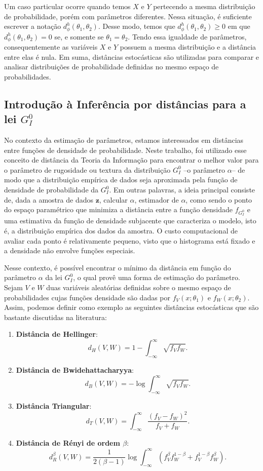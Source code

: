 Um caso particular ocorre quando temos $X$ e $Y$ pertecendo a mesma distribuição de probabilidade, porém com parâmetros diferentes. Nessa situação, é suficiente escrever a notação $d_\phi^h(\theta_1, \theta_2)$. Desse modo, temos que $d_\phi^h(\theta_1, \theta_2) \geq 0$ em que $d_\phi^h(\theta_1, \theta_2) = 0$ se, e somente se $\theta_1 = \theta_2$. Tendo essa igualdade de parâmetros, consequentemente as variáveis $X$ e $Y$ possuem a mesma distribuição e a distância entre elas é nula. Em suma, distâncias estocásticas são utilizadas para comparar e analisar distribuições de probabilidade definidas no mesmo espaço de probabilidades.

\subsection{Introdução à Inferência por distâncias para a lei $G_I^0$}

No contexto da estimação de parâmetros, estamos interessados em distâncias entre funções de densidade de probabilidade. 
Neste trabalho, foi utilizado esse conceito de distância da Teoria da Informação para encontrar o melhor valor para o parâmetro de rugosidade ou textura da distribuição $G_I^0$ --o parâmetro $\alpha$-- de modo que a distribuição empírica de dados seja aproximada pela função de densidade de probabilidade da $G_I^0$. 
Em outras palavras, a ideia principal consiste de, dada a amostra de dados $\bm z$, calcular $\widehat{\alpha}$, estimador de $\alpha$, como sendo o ponto do espaço paramétrico que minimiza a distância entre a função densidade $f_{G_I^0}$ e uma estimativa da função de densidade subjacente que caracteriza o modelo, isto é, a distribuição empírica dos dados da amostra. 
O custo computacional de avaliar cada ponto é relativamente pequeno, visto que o histograma está fixado e a densidade não envolve funções especiais. 

Nesse contexto, é possível encontrar o mínimo da distância em função do parâmetro $\alpha$ da lei $G_I^0$, o qual provê uma forma de estimação do parâmetro. 
Sejam $V$ e $W$ duas variáveis aleatórias definidas sobre o mesmo espaço de probabilidades cujas funções densidade são dadas por $f_V(x; \theta_1)$ e $f_W(x; \theta_2)$. 
Assim, podemos definir como exemplo as seguintes distâncias estocásticas que são bastante discutidas na literatura:
\begin{enumerate}
    \item \textbf{Distância de Hellinger}: $$ d_H(V,W) = 1 - \int_{-\infty}^{\infty}\sqrt{f_V f_W}.$$
    \item \textbf{Distância de Bwidehattacharyya}: $$d_B(V,W) = -\log\int_{-\infty}^{\infty}\sqrt{f_V f_W}.$$
    \item\textbf{Distância Triangular}: $$d_T(V,W) = \int_{-\infty}^{\infty}\dfrac{(f_V - f_W)^2}{f_V + f_W}.$$
    \item \textbf{Distância de Rényi de ordem $\beta$}: $$d_R^\beta(V,W) = \dfrac{1}{2(\beta-1)}\log\int_{-\infty}^{\infty}(f_V^{\beta}f_W^{1-\beta} + f_V^{1-\beta}f_W^{\beta}).$$
\end{enumerate}

